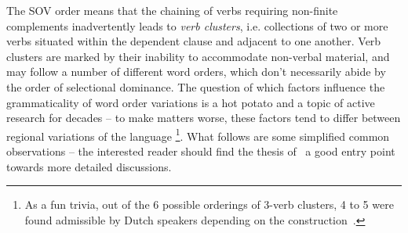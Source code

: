 The SOV order means that the chaining of verbs requiring non-finite complements inadvertently leads to \textit{verb clusters}, i.e. collections of two or more verbs situated within the dependent clause and adjacent to one another.
Verb clusters are marked by their inability to accommodate non-verbal material, and may follow a number of different word orders, which don't necessarily abide by the order of selectional dominance.
The question of which factors influence the grammaticality of word order variations  is a hot potato and a topic of active research for decades -- to make matters worse, these factors tend to differ between regional variations of the language%
	\footnote{As a fun trivia,  out of the 6 possible orderings of 3-verb clusters, 4 to 5 were found admissible by Dutch speakers depending on the construction~\cite{3vc}.}.
What follows are some simplified common observations -- the interested reader should find the thesis of~\citet{augustinus2015complement} a good entry point towards more detailed discussions.

